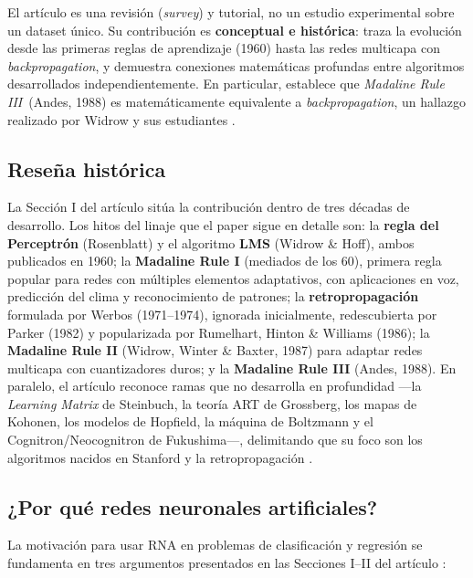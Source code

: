 \documentclass[11pt,a4paper]{article}
\newcommand{\bp}{\textit{backpropagation}}
\newcommand{\mriii}{\textit{Madaline Rule III}}
\begin{document}
El artículo es una revisión (\textit{survey}) y tutorial, no un estudio experimental sobre un
dataset único. Su contribución es \textbf{conceptual e histórica}: traza la evolución desde las
primeras reglas de aprendizaje (1960) hasta las redes multicapa con \bp, y demuestra conexiones
matemáticas profundas entre algoritmos desarrollados independientemente. En particular, establece
que \mriii~(Andes, 1988) es matemáticamente equivalente a \bp, un hallazgo realizado por Widrow
y sus estudiantes \cite{widrow1990}.

\subsection{Reseña histórica}

La Sección I del artículo sitúa la contribución dentro de tres décadas de desarrollo. Los hitos
del linaje que el paper sigue en detalle son: la \textbf{regla del Perceptrón} (Rosenblatt) y el
algoritmo \textbf{LMS} (Widrow \& Hoff), ambos publicados en 1960; la \textbf{Madaline Rule I}
(mediados de los 60), primera regla popular para redes con múltiples elementos adaptativos, con
aplicaciones en voz, predicción del clima y reconocimiento de patrones; la \textbf{retropropagación}
formulada por Werbos (1971--1974), ignorada inicialmente, redescubierta por Parker (1982) y
popularizada por Rumelhart, Hinton \& Williams (1986); la \textbf{Madaline Rule II} (Widrow, Winter
\& Baxter, 1987) para adaptar redes multicapa con cuantizadores duros; y la \textbf{Madaline Rule
III} (Andes, 1988). En paralelo, el artículo reconoce ramas que no desarrolla en profundidad
—la \textit{Learning Matrix} de Steinbuch, la teoría ART de Grossberg, los mapas de Kohonen, los
modelos de Hopfield, la máquina de Boltzmann y el Cognitron/Neocognitron de Fukushima—, delimitando
que su foco son los algoritmos nacidos en Stanford y la retropropagación \cite{widrow1990}.

\subsection{¿Por qué redes neuronales artificiales?}

La motivación para usar RNA en problemas de clasificación y regresión se fundamenta en tres
argumentos presentados en las Secciones I--II del artículo \cite{widrow1990}:
\end{document}
